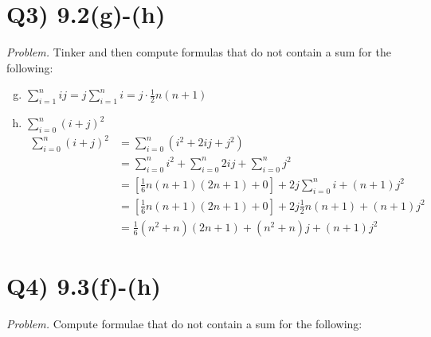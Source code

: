 \documentclass{article}
\begin{document}
\section*{Q3) 9.2(g)-(h)}

\textit{Problem.} Tinker and then compute formulas that do not contain a sum for the following:

\begin{enumerate}[(a)]\setcounter{enumi}{6}
  \item $\sum_{i=1}^n ij = j \sum_{i=1}^n i = j \cdot \frac{1}{2}n(n+1)$
  \item $\sum_{i=0}^n (i+j)^2$ 
    \begin{align*}
      \sum_{i=0}^n (i+j)^2 &= \sum_{i=0}^n (i^2 + 2ij + j^2) \\
      &= \sum_{i=0}^n i^2 + \sum_{i=0}^n 2ij + \sum_{i=0}^n j^2 \\
      &= [\frac{1}{6}n(n+1)(2n+1) + 0] + 2j\sum_{i=0}^n i + (n+1)j^2 \\
      &= [\frac{1}{6}n(n+1)(2n+1) + 0] + 2j\frac{1}{2}n(n+1) + (n+1)j^2 \\
      &= \frac{1}{6}(n^2 + n)(2n+1) + (n^2 + n)j + (n+1)j^2
    \end{align*}
\end{enumerate}




\section*{Q4) 9.3(f)-(h)}

\textit{Problem.} Compute formulae that do not contain a sum for the following:
\end{document}
